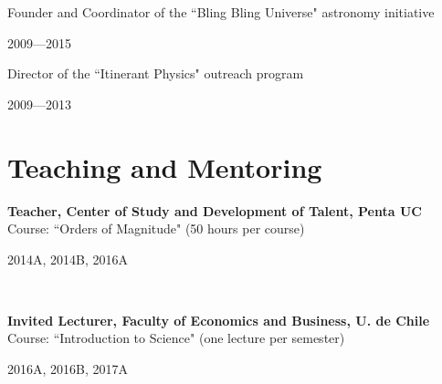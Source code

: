 \documentclass[11pt, a4paper]{article} %
\begin{document}
\vspace{0.3 cm}

\begin{minipage}[t]{0.8\textwidth}
\begin{flushleft}%
  \setlength{\leftskip}{0.2cm}%
Founder and Coordinator of the ``Bling Bling Universe" astronomy initiative
\end{flushleft}
\end{minipage}
\begin{minipage}[t]{0.2\textwidth}
\hfill 2009---2015
\end{minipage}

\vspace{0.3 cm}

\begin{minipage}[t]{0.7\textwidth}
\begin{flushleft}%
  \setlength{\leftskip}{0.2cm}%
Director of the ``Itinerant Physics" outreach program
\end{flushleft}
\end{minipage}
\begin{minipage}[t]{0.3\textwidth}
\hfill 2009---2013
\end{minipage}

\section*{Teaching and Mentoring}

\begin{minipage}[t]{0.7\textwidth}
\begin{flushleft}%
  \setlength{\leftskip}{0.2cm}%
\textbf{Teacher, Center of Study and Development of Talent, Penta UC}\\
Course: ``Orders of Magnitude" (50 hours per course)
\end{flushleft}
\end{minipage}
\begin{minipage}[t]{0.3\textwidth}
\hfill 2014A, 2014B, 2016A
\end{minipage}\\

\begin{minipage}[t]{0.7\textwidth}
\begin{flushleft}%
  \setlength{\leftskip}{0.2cm}%
\textbf{Invited Lecturer, Faculty of Economics and Business, U. de Chile}\\
Course: ``Introduction to Science" (one lecture per semester)
\end{flushleft}
\end{minipage}
\begin{minipage}[t]{0.3\textwidth}
\hfill 2016A, 2016B, 2017A
\end{minipage}
\end{document}
